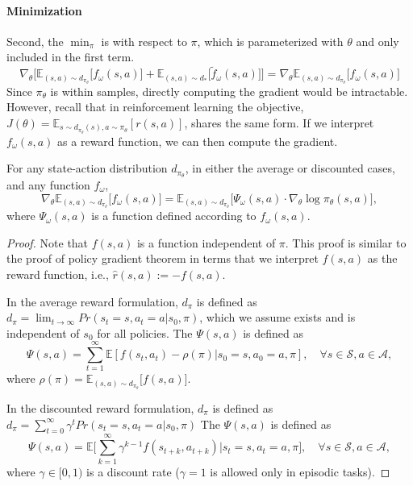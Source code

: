 \paragraph{Minimization} Second, the $\min_{\pi}$ is with respect to $\pi$, which is parameterized with $\theta$ and only included in the first term.
\begin{equation*}
\nabla_{\theta} \Big[ \mathbb{E}_{(s, a)\sim d_{\pi_{\theta}}} \big[ f_{\omega}(s, a) \big] + \mathbb{E}_{(s, a)\sim d_*} \big[ \tilde{f}_{\omega}(s, a) \big] \Big]
= \nabla_{\theta} \mathbb{E}_{(s, a)\sim d_{\pi_{\theta}}} \big[ f_{\omega}(s, a) \big] 
\end{equation*}
Since $\pi_{\theta}$ is within samples, directly computing the gradient would be intractable. However, recall that in reinforcement learning the objective, $J(\theta)=\mathbb{E}_{s\sim d_{\pi_{\theta}}(s), a\sim\pi_{\theta}}[r(s, a)]$, shares the same form. If we interpret $f_{\omega}(s, a)$ as a reward function, we can then compute the gradient. 
\begin{theorem}\label{theo:policy_gradient}
For any state-action distribution $d_{\pi_{\theta}}$, in either the average or discounted cases, and any function $f_{\omega}$, 
\begin{equation*}
\nabla_\theta \mathbb{E}_{(s, a)\sim d_{\pi_{\theta}}}\big[ f_{\omega}(s, a) \big] = \mathbb{E}_{(s, a)\sim d_{\pi_{\theta}}} \big[ \Psi_{\omega}(s, a) \cdot \nabla_\theta \log \pi_{\theta}(s, a) \big], 
\end{equation*}
where $\Psi_{\omega}(s, a)$ is a function defined according to $f_{\omega}(s, a)$. 
\end{theorem}

\begin{proof}
Note that $f(s, a)$ is a function independent of $\pi$. 
This proof is similar to the proof of policy gradient theorem in terms that we interpret $f(s, a)$ as the reward function, i.e., $\hat{r}(s, a) := -f(s, a)$. 

In the average reward formulation, $d_\pi$ is defined as $d_{\pi}=\lim_{t\rightarrow\infty}Pr(s_t=s, a_t=a|s_0, \pi)$, which we assume exists and is independent of $s_0$ for all policies. 
The $\Psi(s, a)$ is defined as 
\begin{equation*}
\Psi(s, a) = \sum_{t=1}^{\infty} \mathbb{E}[f(s_t, a_t) - \rho(\pi) | s_0 = s, a_0 =a, \pi], \quad \forall s\in\mathcal{S}, a\in\mathcal{A}, 
\end{equation*}
where $\rho(\pi) = \mathbb{E}_{(s, a)\sim d_{\pi_{\theta}}}\big[ f(s, a) \big] $. 


In the discounted reward formulation, $d_\pi$ is defined as $d_{\pi}=\sum_{t=0}^{\infty}\gamma^t Pr(s_t=s, a_t=a|s_0, \pi)$
The $\Psi(s, a)$ is defined as 
\begin{equation*}
\Psi(s, a) = \mathbb{E}\big[ \sum_{k=1}^{\infty} \gamma^{k-1} f(s_{t+k}, a_{t+k}) | s_t = s, a_t =a, \pi \big], \quad \forall s\in\mathcal{S}, a\in\mathcal{A}, 
\end{equation*}
where $\gamma\in[0, 1)$ is a discount rate ($\gamma=1$ is allowed only in episodic tasks).
\end{proof}

